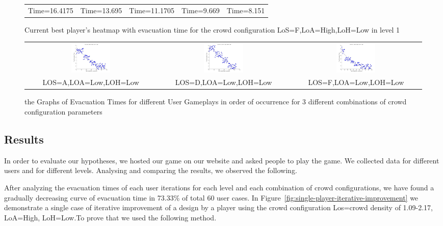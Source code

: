 \begin{figure}[ht]
\begin{tabular}{c c c c c}
	Time=16.4175 & Time=13.695 & Time=11.1705 & Time=9.669 & Time=8.151
\end{tabular}
  \caption{\label{fig:codesign-incremental-improvement}Current best player's heatmap with  evacuation time for the crowd configuration LoS=F,LoA=High,LoH=Low in level 1}
  \begin{tabular}{c c c }
	\includegraphics[width=0.31\textwidth]{images/Hypothesis2Graphs/LOS_A_LOA_Low_LOH_Low.jpg} &  \includegraphics[width=0.31\textwidth]{images/Hypothesis2Graphs/LOS_D_LOA_Low_LOH_Low.jpg} &  \includegraphics[width=0.31\textwidth]{images/Hypothesis2Graphs/LOS_F_LOA_Low_LOH_Low.jpg} \\
	LOS=A,LOA=Low,LOH=Low & LOS=D,LOA=Low,LOH=Low & LOS=F,LOA=Low,LOH=Low
\end{tabular}
  \caption{\label{fig:codesign-heatmap-changes}the Graphs of Evacuation Times for different User Gameplays in order of occurrence for 3 different combinations of crowd configuration parameters}
\end{figure}

\subsection{Results}
In order to evaluate our hypotheses, we hosted our game on our website and asked people to play the game. We collected data for different users and for different levels. Analysing and comparing the results, we observed the following.

After analyzing the evacuation times of each user iterations for each level and each combination of crowd configurations, we have found a gradually decreasing curve of evacuation time in 73.33\% of total 60 user cases. In Figure~\ref{fig:single-player-iterative-improvement} we demonstrate a single case of iterative improvement of a design by a player using the crowd configuration Los=crowd density of 1.09-2.17, LoA=High, LoH=Low.To prove that we used the following method.


